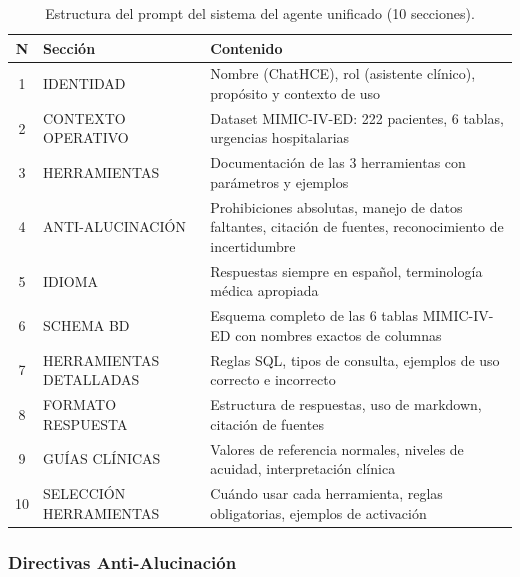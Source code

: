 ﻿\documentclass[11pt,a4paper]{article}
\begin{document}
\begin{table}[H]
\centering
\caption{Estructura del prompt del sistema del agente unificado (10 secciones).}
\label{tab:prompt}
\begin{tabularx}{\textwidth}{clX}
\toprule
\textbf{N} & \textbf{Secci\'on} & \textbf{Contenido} \\
\midrule
1 & IDENTIDAD & Nombre (ChatHCE), rol (asistente cl\'inico), prop\'osito y contexto de uso \\
2 & CONTEXTO OPERATIVO & Dataset MIMIC-IV-ED: 222 pacientes, 6 tablas, urgencias hospitalarias \\
3 & HERRAMIENTAS & Documentaci\'on de las 3 herramientas con par\'ametros y ejemplos \\
4 & ANTI-ALUCINACI\'ON & Prohibiciones absolutas, manejo de datos faltantes, citaci\'on de fuentes, reconocimiento de incertidumbre \\
5 & IDIOMA & Respuestas siempre en espa\~nol, terminolog\'ia m\'edica apropiada \\
6 & SCHEMA BD & Esquema completo de las 6 tablas MIMIC-IV-ED con nombres exactos de columnas \\
7 & HERRAMIENTAS DETALLADAS & Reglas SQL, tipos de consulta, ejemplos de uso correcto e incorrecto \\
8 & FORMATO RESPUESTA & Estructura de respuestas, uso de markdown, citaci\'on de fuentes \\
9 & GU\'IAS CL\'INICAS & Valores de referencia normales, niveles de acuidad, interpretaci\'on cl\'inica \\
10 & SELECCI\'ON HERRAMIENTAS & Cu\'ando usar cada herramienta, reglas obligatorias, ejemplos de activaci\'on \\
\bottomrule
\end{tabularx}
\end{table}

\subsubsection{Directivas Anti-Alucinaci\'on}
\end{document}
